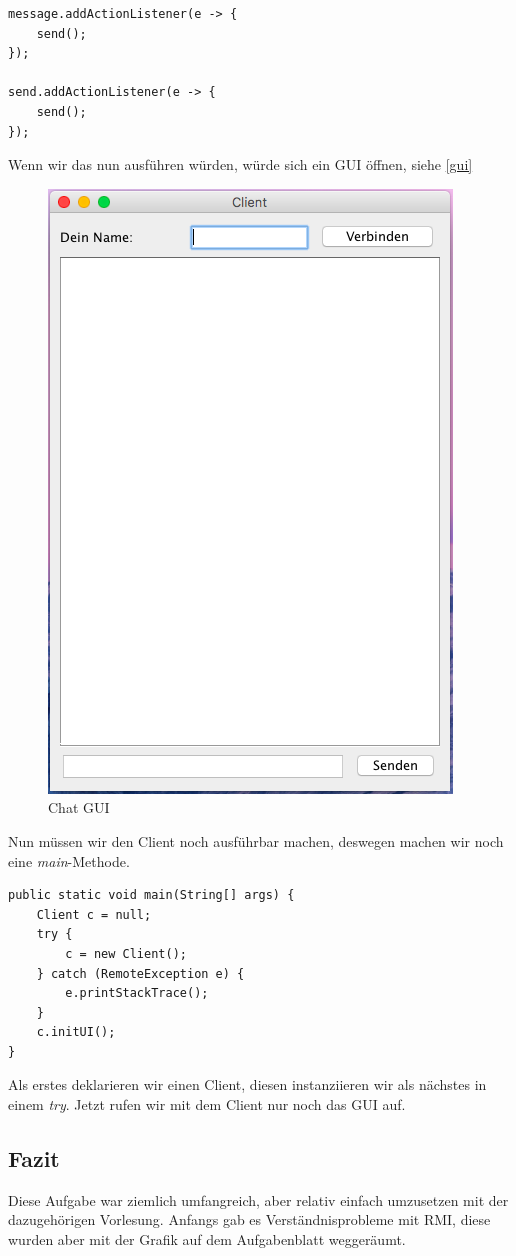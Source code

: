 \begin{lstlisting}
message.addActionListener(e -> {
	send();
});

send.addActionListener(e -> {
	send();
});
\end{lstlisting}
Wenn wir das nun ausführen würden, würde sich ein GUI öffnen, siehe \autoref{gui}
\begin{figure}[H]
	\centering
	\includegraphics[width=0.2 \linewidth]{images/rmi_gui}
	\caption{Chat GUI} \label{gui}
\end{figure} 

Nun müssen wir den Client noch ausführbar machen, deswegen machen wir noch eine \textit{main}-Methode.
\begin{lstlisting}
public static void main(String[] args) {
	Client c = null;
	try {
		c = new Client();
	} catch (RemoteException e) {
		e.printStackTrace();
	}
	c.initUI();
}
\end{lstlisting}
Als erstes deklarieren wir einen Client, diesen instanziieren wir als nächstes in einem \textit{try}. Jetzt rufen wir mit dem Client nur noch das GUI auf. 

\subsection{Fazit}
Diese Aufgabe war ziemlich umfangreich, aber relativ einfach umzusetzen mit der dazugehörigen Vorlesung. Anfangs gab es Verständnisprobleme mit RMI, diese wurden aber mit der Grafik auf dem Aufgabenblatt weggeräumt.




